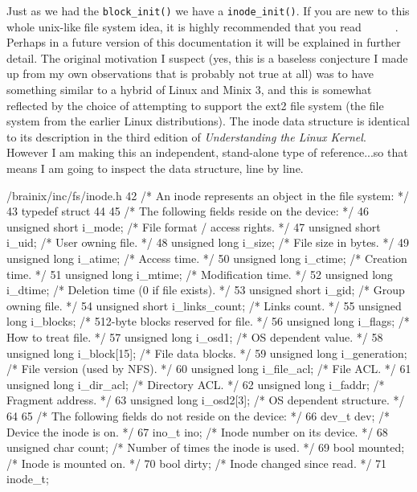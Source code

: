 \documentclass{article}
\begin{document}
Just as we had the \verb|block_init()| we have a \verb|inode_init()|. If you are new to this whole unix-like file system idea, it is highly recommended that you read~\cite{1}~\cite{2}~\cite{3}~\cite{4}~\cite{5}~\cite{6}. Perhaps in a future version of this documentation it will be explained in further detail. The original motivation I suspect (yes, this is a baseless conjecture I made up from my own observations that is probably not true at all) was to have something similar to a hybrid of Linux and Minix 3, and this is somewhat reflected by the choice of attempting to support the ext2 file system (the file system from the earlier Linux distributions). The inode data structure is identical to its description in the third edition of \textit{Understanding the Linux Kernel}. However I am making this an independent, stand-alone type of reference...so that means I am going to inspect the data structure, line by line.
\begin{code}{/brainix/inc/fs/inode.h}
42 /* An inode represents an object in the file system: */
43 typedef struct
44 {
45      /* The following fields reside on the device: */
46      unsigned short i_mode;        /* File format / access rights.       */
47      unsigned short i_uid;         /* User owning file.                  */
48      unsigned long i_size;         /* File size in bytes.                */
49      unsigned long i_atime;        /* Access time.                       */
50      unsigned long i_ctime;        /* Creation time.                     */
51      unsigned long i_mtime;        /* Modification time.                 */
52      unsigned long i_dtime;        /* Deletion time (0 if file exists).  */
53      unsigned short i_gid;         /* Group owning file.                 */
54      unsigned short i_links_count; /* Links count.                       */
55      unsigned long i_blocks;       /* 512-byte blocks reserved for file. */
56      unsigned long i_flags;        /* How to treat file.                 */
57      unsigned long i_osd1;         /* OS dependent value.                */
58      unsigned long i_block[15];    /* File data blocks.                  */
59      unsigned long i_generation;   /* File version (used by NFS).        */
60      unsigned long i_file_acl;     /* File ACL.                          */
61      unsigned long i_dir_acl;      /* Directory ACL.                     */
62      unsigned long i_faddr;        /* Fragment address.                  */
63      unsigned long i_osd2[3];      /* OS dependent structure.            */
64 
65      /* The following fields do not reside on the device: */
66      dev_t dev;                    /* Device the inode is on.            */
67      ino_t ino;                    /* Inode number on its device.        */
68      unsigned char count;          /* Number of times the inode is used. */
69      bool mounted;                 /* Inode is mounted on.               */
70      bool dirty;                   /* Inode changed since read.          */
71 } inode_t;
\end{code}
\end{document}
